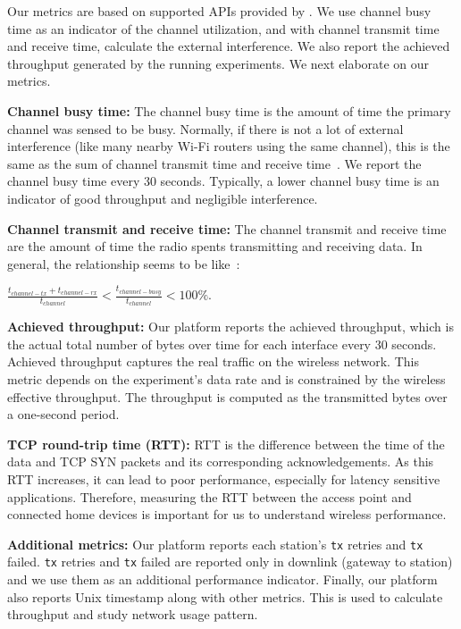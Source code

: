 Our metrics are based on supported APIs provided by \sysname. We use channel busy time as an indicator of the channel utilization, and with channel transmit time and receive time, calculate the external interference. We also report the achieved throughput generated by the running experiments. We next elaborate on our metrics.

\textbf{Channel busy time:} The channel busy time is the amount of time the primary channel was sensed to be busy. Normally, if there is not a lot of external interference (like many nearby Wi-Fi routers using the same channel), this is the same as the sum of channel transmit time and receive time~\cite{channelsurvey}. We report the channel busy time every 30 seconds. Typically, a lower channel busy time is an indicator of good throughput and negligible interference.

\textbf{Channel transmit and receive time:} The channel transmit and receive time are the amount of time the radio spents transmitting and receiving data. In general, the relationship seems to be like~\cite{cfg80211}: 

\(\frac{t_{channel-tx} + t_{channel-rx}}{t_{channel}} < \frac{t_{channel-busy}}{t_{channel}} < 100\%\).

\textbf{Achieved throughput:} Our platform reports the achieved throughput, which is the actual total number of bytes over time for each interface every 30 seconds. Achieved throughput captures the real traffic on the wireless network. This metric depends on the experiment's data rate and is constrained by the wireless effective throughput. The throughput is computed as the transmitted bytes over a one-second period.

\textbf{TCP round-trip time (RTT):} RTT is the difference between the time of the data and TCP SYN packets and its corresponding acknowledgements. As this RTT increases, it can lead to poor performance, especially for latency sensitive applications. Therefore, measuring the RTT between the access point and connected home devices is important for us to understand wireless performance.

\textbf{Additional metrics:} Our platform reports each station's \texttt{tx} retries and \texttt{tx} failed. \texttt{tx} retries and \texttt{tx} failed are reported only in downlink (gateway to station) and we use them as an additional performance indicator. Finally, our platform also reports Unix timestamp along with other metrics. This is used to calculate throughput and study network usage pattern. 

